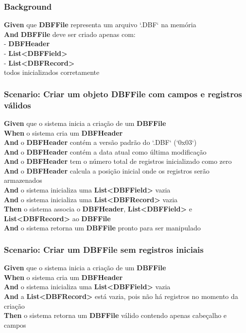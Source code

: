\subsubsection{Background}
\textbf{Given} que \textbf{DBFFile} representa um arquivo `.DBF` na memória \\
\textbf{And} \textbf{DBFFile} deve ser criado apenas com: \\
- \textbf{DBFHeader} \\
- \textbf{List<DBFField>}\\
- \textbf{List<DBFRecord>}\\
todos inicializados corretamente

\subsubsection{Scenario: Criar um objeto DBFFile com campos e registros válidos}
\textbf{Given} que o sistema inicia a criação de um \textbf{DBFFile} \\
\textbf{When} o sistema cria um \textbf{DBFHeader} \\
\textbf{And} o \textbf{DBFHeader} contém a versão padrão do `.DBF` (`0x03`) \\
\textbf{And} o \textbf{DBFHeader} contém a data atual como última modificação \\
\textbf{And} o \textbf{DBFHeader} tem o número total de registros inicializado como zero \\
\textbf{And} o \textbf{DBFHeader} calcula a posição inicial onde os registros serão armazenados \\
\textbf{And} o sistema inicializa uma \textbf{List<DBFField>} vazia \\
\textbf{And} o sistema inicializa uma \textbf{List<DBFRecord>} vazia \\
\textbf{Then} o sistema associa o \textbf{DBFHeader}, \textbf{List<DBFField>} e \textbf{List<DBFRecord>} ao \textbf{DBFFile} \\
\textbf{And} o sistema retorna um \textbf{DBFFile} pronto para ser manipulado \\

\subsubsection{Scenario: Criar um DBFFile sem registros iniciais}
\textbf{Given} que o sistema inicia a criação de um \textbf{DBFFile} \\
\textbf{When} o sistema cria um \textbf{DBFHeader} \\
\textbf{And} o sistema inicializa uma \textbf{List<DBFField>} vazia \\
\textbf{And} a \textbf{List<DBFRecord>} está vazia, pois não há registros no momento da criação \\
\textbf{Then} o sistema retorna um \textbf{DBFFile} válido contendo apenas cabeçalho e campos \\


